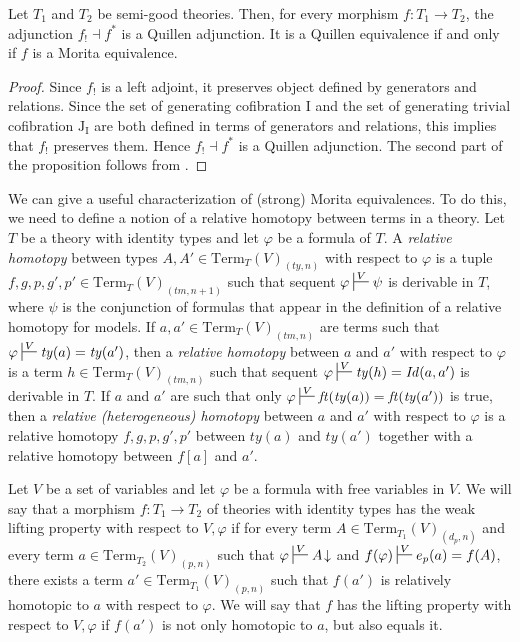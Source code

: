 \documentclass[reqno]{amsart}
\theoremstyle{definition}
\theoremstyle{remark}
\newcommand{\Term}{\mathrm{Term}}
\newcommand{\Id}{\mathit{Id}}
\newcommand{\ft}{\mathit{ft}}
\newcommand{\ty}{\mathit{ty}}
\newcommand{\tm}{\mathit{tm}}
\newcommand{\I}{\mathrm{I}}
\newcommand{\J}{\mathrm{J}}
\numberwithin{figure}{section}
\begin{document}
\begin{prop}
Let $T_1$ and $T_2$ be semi-good theories.
Then, for every morphism $f : T_1 \to T_2$, the adjunction $f_! \dashv f^*$ is a Quillen adjunction.
It is a Quillen equivalence if and only if $f$ is a Morita equivalence.
\end{prop}
\begin{proof}
Since $f_!$ is a left adjoint, it preserves object defined by generators and relations.
Since the set of generating cofibration $\I$ and the set of generating trivial cofibration $\J_\I$
are both defined in terms of generators and relations, this implies that $f_!$ preserves them.
Hence $f_! \dashv f^*$ is a Quillen adjunction.
The second part of the proposition follows from \cite[Corollary~3.9]{f-model-structures}.
\end{proof}

We can give a useful characterization of (strong) Morita equivalences.
To do this, we need to define a notion of a relative homotopy between terms in a theory.
Let $T$ be a theory with identity types and let $\varphi$ be a formula of $T$.
A \emph{relative homotopy} between types $A,A' \in \Term_T(V)_{(\ty,n)}$ with respect to $\varphi$ is a tuple $f,g,p,g',p' \in \Term_T(V)_{(\tm,n+1)}$
such that sequent $\varphi \sststile{}{V} \psi$ is derivable in $T$, where $\psi$ is the conjunction of formulas that appear in the definition of a relative homotopy for models.
If $a,a' \in \Term_T(V)_{(\tm,n)}$ are terms such that $\varphi \sststile{}{V} \ty(a) = \ty(a')$, then a \emph{relative homotopy} between $a$ and $a'$ with respect to $\varphi$ is a term $h \in \Term_T(V)_{(\tm,n)}$
such that sequent $\varphi \sststile{}{V} \ty(h) = \Id(a,a')$ is derivable in $T$.
If $a$ and $a'$ are such that only $\varphi \sststile{}{V} \ft(\ty(a)) = \ft(\ty(a'))$ is true, then a \emph{relative (heterogeneous) homotopy} between $a$ and $a'$ with respect to $\varphi$
is a relative homotopy $f,g,p,g',p'$ between $\ty(a)$ and $\ty(a')$ together with a relative homotopy between $f[a]$ and $a'$.

Let $V$ be a set of variables and let $\varphi$ be a formula with free variables in $V$.
We will say that a morphism $f : T_1 \to T_2$ of theories with identity types has the weak lifting property with respect to $V,\varphi$ if
for every term $A \in \Term_{T_1}(V)_{(d_p,n)}$ and every term $a \in \Term_{T_2}(V)_{(p,n)}$ such that $\varphi \sststile{}{V} A\!\downarrow$ and $f(\varphi) \sststile{}{V} e_p(a) = f(A)$,
there exists a term $a' \in \Term_{T_1}(V)_{(p,n)}$ such that $f(a')$ is relatively homotopic to $a$ with respect to $\varphi$.
We will say that $f$ has the lifting property with respect to $V,\varphi$ if $f(a')$ is not only homotopic to $a$, but also equals it.
\end{document}
